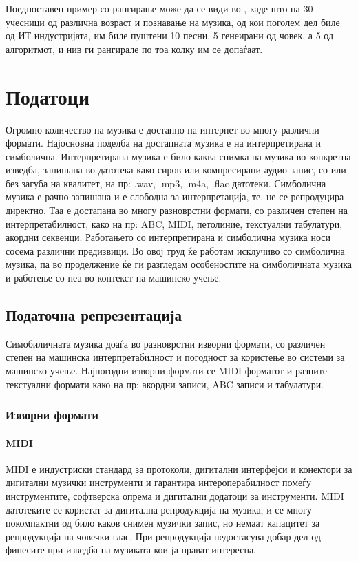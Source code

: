 Поедноставен пример со рангирање може да се види во \cite{GarciaSalas2011}, каде што на 30 учесници од различна возраст и познавање на музика, од кои поголем дел биле од ИТ индустријата, им биле пуштени 10 песни, 5 генеирани од човек, а 5 од алгоритмот, и нив ги рангирале по тоа колку им се допаѓаат.

\chapter{Податоци}
\label{ch:podatoci}

Огромно количество на музика е достапно на интернет во многу различни формати. Најосновна поделба на достапната музика е на интерпретирана и симболична. Интерпретирана музика е било каква снимка на музика во конкретна изведба, запишана во датотека како сиров или компресирани аудио запис, со или без загуба на квалитет, на пр: .wav, .mp3, .m4a, .flac датотеки. Симболична музика е рачно запишана и е слободна за интерпретација, те. не се репродуцира директно. Таа е достапана во многу разноврстни формати, со различен степен на интерпретабилност, како на пр: ABC, MIDI, петолиние, текстуални табулатури, акордни секвенци.
Работањето со интерпретирана и симболична музика носи сосема различни предизвици. Во овој труд ќе работам исклучиво со симболична музика, па во проделжение ќе ги разгледам особеностите на симболичната музика и работење со неа во контекст на машинско учење.

\section{Податочна репрезентација}

Симобиличната музика доаѓа во разноврстни изворни формати, со различен степен на машинска интерпретабилност и погодност за користење во системи за машинско учење. Најпогодни изворни формати се MIDI форматот и разните текстуални формати како на пр: акордни записи, ABC записи и табулатури. 

\subsection{Изворни формати}

\subsubsection{MIDI}

MIDI е индустриски стандард за протоколи, дигитални интерфејси и конектори за дигитални музички инструменти и гарантира интероперабилност помеѓу инструментите, софтверска опрема и дигитални додатоци за инструменти. MIDI датотеките се користат за дигитална репродукција на музика, и се многу покомпактни од било каков снимен музички запис, но немаат капацитет за репродукција на човечки глас. При репродукција недостасува добар дел од финесите при изведба на музиката кои ја прават интересна.

